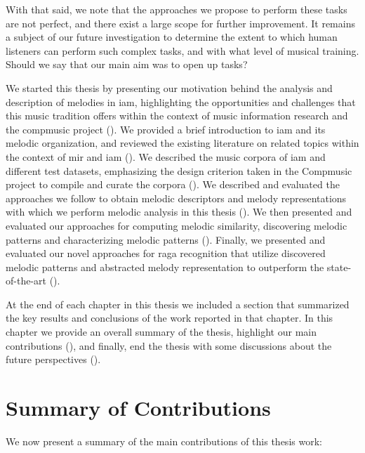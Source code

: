 With that said, we note that the approaches we propose to perform these tasks are not perfect, and there exist a large scope for further improvement. It remains a subject of our future investigation to determine the extent to which human listeners can perform such complex tasks, and with what level of musical training. Should we say that our main aim was to open up tasks?

We started this thesis by presenting our motivation behind the analysis and description of melodies in \gls{iam}, highlighting the opportunities and challenges that this music tradition offers within the context of music information research and the compmusic project (). We provided a brief introduction to \gls{iam} and its melodic organization,  and reviewed the existing literature on related topics within the context of \gls{mir} and \gls{iam} (). We described the music corpora of \gls{iam} and different test datasets, emphasizing the design criterion taken in the Compmusic project to compile and curate the corpora ().  We described and evaluated the approaches we follow to obtain melodic descriptors and melody representations with which we perform melodic analysis in this thesis (). We then presented and evaluated our approaches for computing melodic similarity, discovering melodic patterns and characterizing melodic patterns (). Finally, we presented and evaluated our novel approaches for \gls{raga} recognition that utilize discovered melodic patterns and abstracted melody representation to outperform the state-of-the-art ().

At the end of each chapter in this thesis we included a section that summarized the key results and conclusions of the work reported in that chapter. In this chapter we provide an overall summary of the thesis, highlight our main contributions (), and finally, end the thesis with some discussions about the future perspectives (). 
 
\section{Summary of Contributions}
\label{sec:summary_contributions}

We now present a summary of the main contributions of this thesis work:

